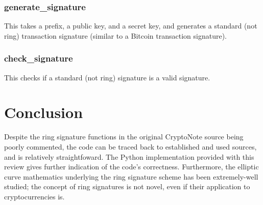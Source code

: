 \documentclass[12pt,english]{mrl}
\numberwithin{equation}{section}
\numberwithin{figure}{section}
\begin{document}
\subsubsection{generate\_signature}

This takes a prefix, a public key, and a secret key, and generates
a standard (not ring) transaction signature (similar to a Bitcoin
transaction signature). 


\subsubsection{check\_signature}

This checks if a standard (not ring) signature is a valid signature. 

\section{Conclusion}
Despite the ring signature functions in the original CryptoNote source being poorly commented, the code can be traced back to established and used sources, and is relatively straightfoward. The Python implementation provided with this review gives further indication of the code's correctness. Furthermore, the elliptic curve mathematics underlying the ring signature scheme has been extremely-well studied; the concept of ring signatures is not novel, even if their application to cryptocurrencies is.

\medskip{}
\end{document}
